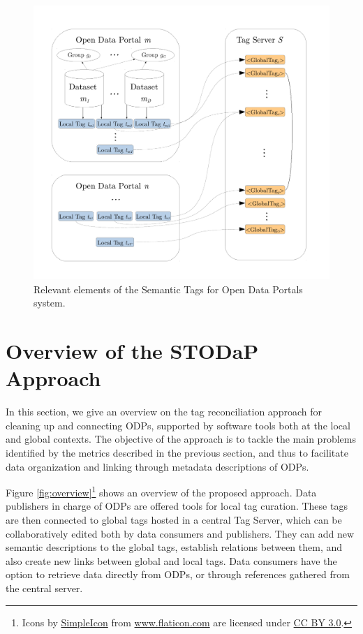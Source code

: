\begin{figure}
\begin{center}
\includegraphics[scale=0.6]{images/odp_definition.pdf}
\caption{Relevant elements of the Semantic Tags for Open Data Portals system.}
\label{fig:definition}
\end{center}
\end{figure}


\section{Overview of the STODaP Approach}
\label{sec:stodap_overview}

In this section, we give an overview on the tag reconciliation approach for cleaning up and connecting ODPs, supported by software tools both at the local and global contexts.
The objective of the approach is to tackle the main problems identified by the metrics described in the previous section, and thus to facilitate data organization and linking through metadata descriptions of ODPs.

Figure \ref{fig:overview}\footnote{Icons by \href{http://www.flaticon.com/authors/simpleicon}{SimpleIcon} from \href{http://www.flaticon.com}{www.flaticon.com} are licensed under \href{http://creativecommons.org/licenses/by/3.0/}{CC BY 3.0}.} shows an overview of the proposed approach.
Data publishers in charge of ODPs are offered tools for local tag curation.
These tags are then connected to global tags hosted in a central Tag Server, which can be collaboratively edited both by data consumers and publishers. 
They can add new semantic descriptions to the global tags, establish relations between them, and also create new links between global and local tags.
Data consumers have the option to retrieve data directly from ODPs, or through references gathered from the central server.

